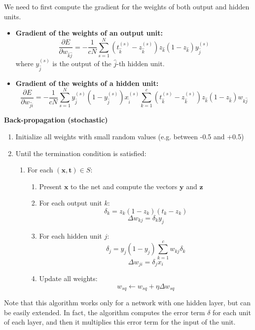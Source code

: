 We need to first compute the gradient for the weights of both output and hidden units.
\begin{itemize}
    \item \textbf{Gradient of the weights of an output unit:}
    \[\frac{\partial E}{\partial w_{\hat{k}\hat{j}}} = - \frac{1}{cN}\sum_{s=1}^{N}(t_{\hat{k}}^{(s)} - z_{\hat{k}}^{(s)} )z_{\hat{k}}(1 - z_{\hat{k}})y_{\hat{j}}^{(s)}\]
    where $y_{\hat{j}}^{(s)}$ is the output of the $\hat{j}$-th hidden unit.
    
    \item \textbf{Gradient of the weights of a hidden unit:}
    \[\frac{\partial E}{\partial w_{\hat{j}\hat{i}}} = - \frac{1}{cN}\sum_{s=1}^{N}y_{\hat{j}}^{(s)}(1 - y_{\hat{j}}^{(s)})x_{\hat{i}}^{(s)}\sum_{k=1}^{c}(t_{\hat{k}}^{(s)} - z_{\hat{k}}^{(s)} )z_{\hat{k}}(1 - z_{\hat{k}})w_{k\hat{j}}\]
\end{itemize}

\textbf{Back-propagation (stochastic)}
\begin{enumerate}
    \item Initialize all weights with small random values (e.g. between -0.5 and +0.5)
    \item Until the termination condition is satisfied:
    \begin{enumerate}
        \item For each $(\textbf{x},\textbf{t}) \in S$:
        \begin{enumerate}
            \item Present $\textbf{x}$ to the net and compute the vectors $\textbf{y}$ and $\textbf{z}$
            \item For each output unit $k$:
            \[\delta_{k} = z_{k}(1 - z_{k})(t_{k} - z_{k})\]
            \[\Delta w_{kj} = \delta_{k}y_{j}\]

            \item For each hidden unit $j$:
            \[\delta_{j} = y_{j}(1 - y_{j})\sum_{k=1}^{c}w_{kj}\delta_{k}\]
            \[\Delta w_{ji} = \delta_{j}x_{i}\]

            \item Update all weights:
            \[w_{sq} \leftarrow w_{sq} + \eta \Delta w_{sq}\]
        \end{enumerate}
    \end{enumerate}
\end{enumerate}
Note that this algorithm works only for a network with one hidden layer, but can be easily extended. In fact, the algorithm computes the error term $\delta$ for each unit of each layer, and then it multiplies this error term for the input of the unit.

